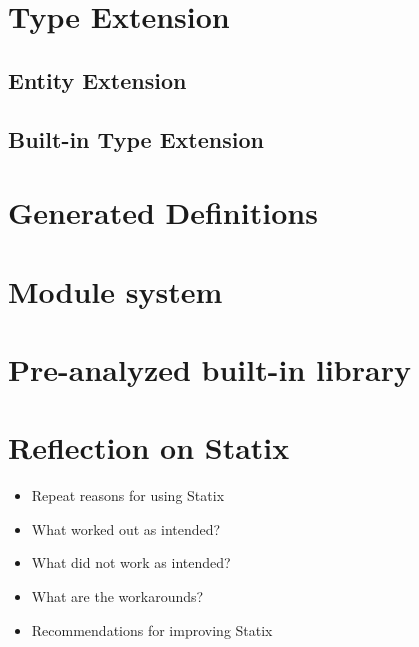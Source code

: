   \section{\label{sec:type-extension}Type Extension}

    \subsection{\label{subsec:entity-extension}Entity Extension}

    \subsection{\label{subsec:built-in-extension}Built-in Type Extension}

  \section{\label{sec:generated-definitions}Generated Definitions}

  \section{\label{sec:module-system}Module system}

  \section{\label{sec:built-in-library}Pre-analyzed built-in library}

  \section{\label{sec:statix-reflection}Reflection on Statix}

    \begin{itemize}
      \item Repeat reasons for using Statix
      \item What worked out as intended?
      \item What did not work as intended?
      \item What are the workarounds?
      \item Recommendations for improving Statix
    \end{itemize}
